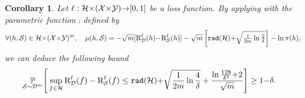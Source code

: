 \documentclass[twoside]{article}
\theoremstyle{plain}
\newtheorem{corollary}[theorem]{Corollary}
\begin{document}
\begin{corollary}\label{corollary:dis-uc-rad}
Let $\ell: \mathcal{H}{\times}(\mathcal{X}{\times}\mathcal{Y}){\to}[0,1]$ be a loss function.
By applying  with the parametric function $\comp$ defined by
\begin{align*}
    \forall (h,\mathcal{S})\in\mathcal{H}{\times}(\mathcal{X}{\times}\mathcal{Y})^m,\quad \operatorname{\mu}(h, \mathcal{S}) = -\sqrt{m}[\text{R}^{\ell}_{\mathcal{D}}(h){-}\text{R}^{\ell}_{\mathcal{S}}(h)]  -\sqrt{m}\left[{\tt rad}(\mathcal{H}) {+} \sqrt{\tfrac{1}{2m}\ln\tfrac{2}{\delta}}\right] -\ln\pi(h),
\end{align*}
we can deduce the following bound 
\begin{align*}
\operatorname*{\mathbb{P}}_{\mathcal{S}\sim\mathcal{D}^m}&\Bigg[ \sup_{f\in\mathcal{H}}\text{R}^{\ell}_{\mathcal{D}}(f) - \text{R}^{\ell}_{\mathcal{S}}(f) \le {\tt rad}(\mathcal{H}) {+} \sqrt{\frac{1}{2m}\ln\frac{4}{\delta}} + \frac{\ln\frac{128}{\delta^3}{+}2}{\sqrt{m}}\Bigg] \ge 1{-}\delta.
\end{align*}    
\end{corollary}
\end{document}
